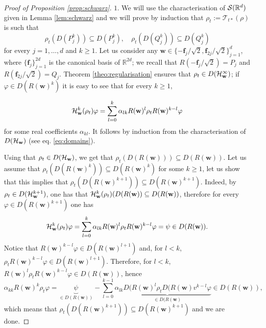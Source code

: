 \documentclass[preprint]{elsarticle}
\theoremstyle{definition}
\def\RR{\mathbb{R}}
\def\TT{\mathcal{T}}
\begin{document}
\begin{proof}[Proof of Proposition \ref{prop:schwarz}]
$1.$ We will use the characterisation of ${\cal S}(\RR^{d})$ given in Lemma \ref{lem:schwarz} and we will prove by induction that $\rho_t:=\TT_{t*}(\rho)$ is such that
$$\rho_t(D(P_j^k)) \subseteq D(P_j^k), \quad \rho_t(D(Q_j^k)) \subseteq D(Q_j^k)$$
for every $j=1,\dots, d$ and $k \geq 1.$ Let us consider any $\mathbf{w} \in \{-\mathbf{f}_j/\sqrt{2}, \mathbf{f}_{2j}/\sqrt{2}\}_{j =1}^{d}$, where $\{\mathbf{f}_j\}_{j=1}^{2d}$ is the canonical basis of $\RR^{2d}$; we recall that $R(-\mathbf{f}_j/\sqrt{2})=P_j$ and $R(\mathbf{f}_{2j}/\sqrt{2})=Q_j$. Theorem \ref{theo:regularisation} ensures that $\rho_t \in D({\cal H}_{\mathbf{w}}^\infty)$; if $\varphi \in D(R(\mathbf{w})^{k})$ it is easy to see that for every $k \geq 1$, 

$${\cal H}_\mathbf{w}^k(\rho_t)\varphi=\sum_{l=0}^{k} \alpha_{lk} R(\mathbf{w})^l\rho_t R(\mathbf{w})^{k-l}\varphi$$
for some real coefficients $\alpha_{kl}.$ It follows by induction from the characterisation of $D({\cal H}_{\mathbf{w}})$ (see eq. \eqref{eq:domains}).

Using that $\rho_t \in D({\cal H}_{\mathbf{w}})$, we get that $\rho_t (D(R(\mathbf{w}))) \subseteq D(R(\mathbf{w}))$. Let us assume that $\rho_t (D(R(\mathbf{w})^k)) \subseteq D(R(\mathbf{w})^k)$ for some $k \geq 1$, let us show that this implies that $\rho_t (D(R(\mathbf{w})^{k+1})) \subseteq D(R(\mathbf{w})^{k+1})$. Indeed, by $\rho_t \in D({\cal H}_\mathbf{w}^{k+1})$, one has that
${\cal H}_\mathbf{w}^k(\rho_t)(D(R(\mathbf{w})) \subseteq D(R(\mathbf{w}))$, therefore for every $\varphi \in D(R(\mathbf{w})^{k+1})$ one has
$${\cal H}_\mathbf{w}^k(\rho_t)\varphi=\sum_{l=0}^{k} \alpha_{lk} R(\mathbf{w})^l \rho_t R(\mathbf{w})^{k-l}\varphi=\psi \in D(R(\mathbf{w})).$$
Notice that $R(\mathbf{w})^{k-l}\varphi \in D(R(\mathbf{w})^{l+1})$ and, for $l <k$, $\rho_t R(\mathbf{w})^{k-l}\varphi \in D(R(\mathbf{w})^{l+1})$. Therefore, for $l <k$, $R(\mathbf{w})^l \rho_t R(\mathbf{w})^{k-l}\varphi \in D(R(\mathbf{w}))$, hence
$$\alpha_{kk}R(\mathbf{w})^k \rho_t \varphi=\underbrace{\psi}_{\in D(R(\mathbf{w}))}-\sum_{l=0}^{k-1}\alpha_{lk}\underbrace{D(R(\mathbf{w})^l \rho_t D(R(\mathbf{w})v^{k-l}\varphi}_{\in D(R(\mathbf{w})}\in D(R(\mathbf{w})),$$
which means that $\rho_t(D(R(\mathbf{w})^{k+1}))\subseteq D(R(\mathbf{w})^{k+1})$ and we are done.


\end{proof}
\end{document}
